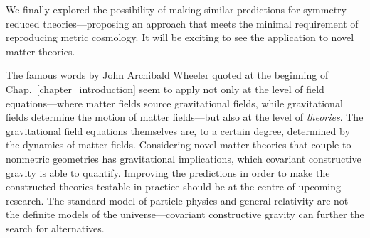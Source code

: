 We finally explored the possibility of making similar predictions for symmetry-reduced theories---proposing an approach that meets the minimal requirement of reproducing metric cosmology. It will be exciting to see the application to novel matter theories.

The famous words by John Archibald Wheeler quoted at the beginning of Chap.~\ref{chapter_introduction} seem to apply not only at the level of field equations---where matter fields source gravitational fields, while gravitational fields determine the motion of matter fields---but also at the level of \emph{theories}. The gravitational field equations themselves are, to a certain degree, determined by the dynamics of matter fields. Considering novel matter theories that couple to nonmetric geometries has gravitational implications, which covariant constructive gravity is able to quantify. Improving the predictions in order to make the constructed theories testable in practice should be at the centre of upcoming research. The standard model of particle physics and general relativity are not the definite models of the universe---covariant constructive gravity can further the search for alternatives.
